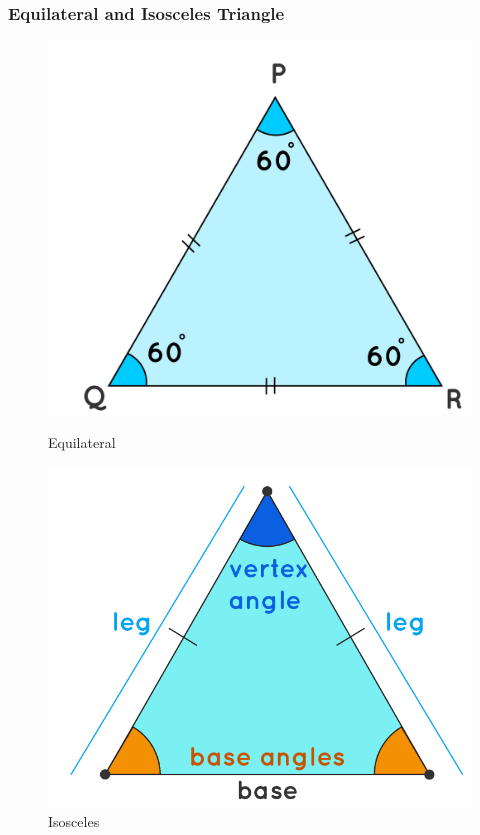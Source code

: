 \documentclass{beamer}
\begin{document}
\begin{frame}
    \frametitle{Equilateral and Isosceles Triangle}
    \begin{figure}[h]    
        \begin{minipage}[b]{0.4\textwidth}
        \centering
        \includegraphics[scale=0.1]{equilateral_triangle.png}
        \caption{Equilateral}
    \end{minipage}
    \begin{minipage}[b]{0.4\textwidth}
        \centering
        \includegraphics[scale=0.15]{isoscles_triangle.png}
        \caption{Isosceles}
    \end{minipage}
\end{figure}
\end{frame}
\end{document}
